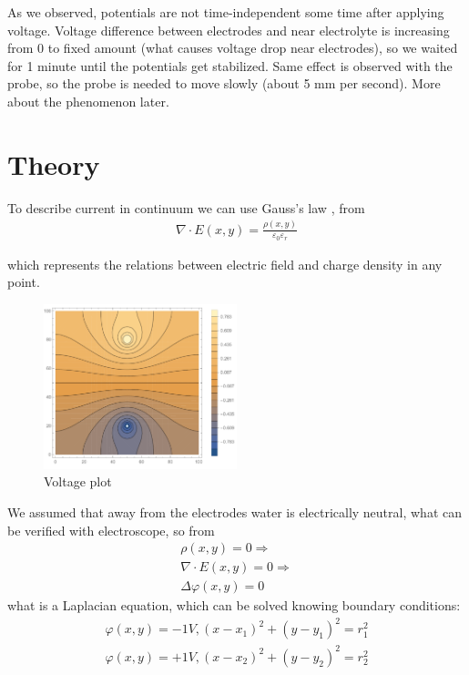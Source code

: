 \documentclass{article}
\begin{document}
As we observed, potentials are not time-independent some time after applying voltage. Voltage difference between electrodes and near electrolyte is increasing from 0 to fixed amount (what causes voltage drop near electrodes), so we waited for 1 minute until the potentials get stabilized. Same effect is observed with the probe, so the probe is needed to move slowly (about 5 mm per second). More about the phenomenon later. \par


\section{Theory}

To describe current in continuum we can use Gauss's law \cite{gauss}, \cite{landavshic} 
from \begin{equation}
  \begin{aligned}
  \nabla\cdot E (x, y) = \frac{\rho (x, y)}{\varepsilon_0 \varepsilon_r}
  \end{aligned}
\end{equation}
	  
   which represents the relations between electric field and charge density in any point.\par

\begin{figure}[h]
    \centering
    \includegraphics[width=0.5\textwidth]{theory plot.pdf}
    \caption{Voltage plot}
    \label{fig:mesh3}
\end{figure}

We assumed that away from the electrodes water is electrically neutral, what can be verified with electroscope, so from \begin{equation}
  \begin{aligned}
    \rho (x, y) = 0 \Rightarrow\\
  	\nabla \cdot E (x, y) = 0 \Rightarrow \\
    \Delta \varphi (x, y) = 0 
  \end{aligned}
\end{equation}
 what is a Laplacian equation, which can be solved knowing boundary conditions:
\begin{equation}
  \begin{aligned}
    \varphi (x, y) = -1 V, (x - x_1)^2 + (y - y_1)^2 = r_1^2 \\
    \varphi (x, y) = +1 V, (x - x_2)^2 + (y - y_2)^2 = r_2^2
  \end{aligned}
\end{equation}
\end{document}
